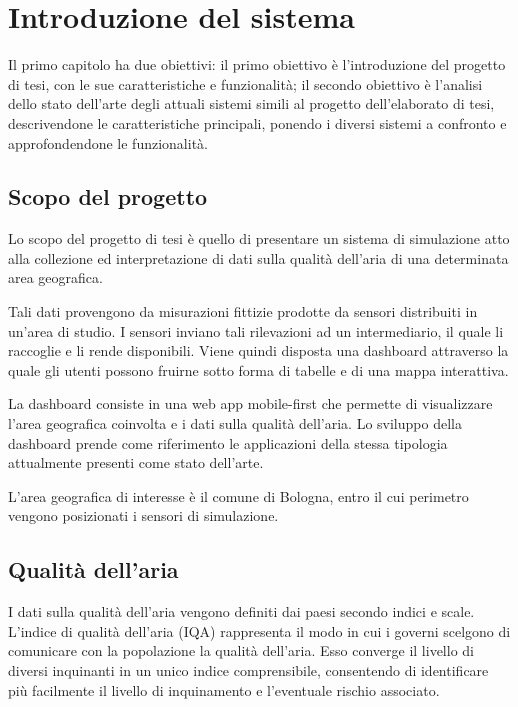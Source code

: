 \clearpage{\pagestyle{empty}\cleardoublepage}
\chapter{Introduzione del sistema}
\lhead[\fancyplain{}{\bfseries\thepage}]{\fancyplain{}{\bfseries\rightmark}}

Il primo capitolo ha due obiettivi:
il primo obiettivo è l'introduzione del progetto di tesi, con le sue caratteristiche e funzionalità;
il secondo obiettivo è l'analisi dello stato dell'arte degli attuali sistemi simili al progetto dell'elaborato di tesi,
descrivendone le caratteristiche principali, ponendo i diversi sistemi a confronto e approfondendone le funzionalità.

\section{Scopo del progetto}

Lo scopo del progetto di tesi è quello di presentare un sistema di simulazione atto alla collezione ed interpretazione
di dati sulla qualità dell'aria di una determinata area geografica.

Tali dati provengono da misurazioni fittizie prodotte da sensori distribuiti in un'area di studio.
I sensori inviano tali rilevazioni ad un intermediario, il quale li raccoglie e li rende disponibili.
Viene quindi disposta una dashboard attraverso la quale gli utenti possono fruirne sotto forma di tabelle e
di una mappa interattiva.

La dashboard consiste in una web app mobile-first che permette di visualizzare l'area geografica coinvolta e
i dati sulla qualità dell'aria.
Lo sviluppo della dashboard prende come riferimento le applicazioni della stessa tipologia attualmente presenti
come stato dell'arte.

L'area geografica di interesse è il comune di Bologna, entro il cui perimetro vengono posizionati i sensori
di simulazione.

\cite{Accuweather}

\section{Qualità dell'aria}
I dati sulla qualità dell'aria vengono definiti dai paesi secondo indici e scale.
L'indice di qualità dell'aria (IQA) rappresenta il modo in cui i governi scelgono di comunicare con la popolazione
la qualità dell'aria. Esso converge il livello di diversi inquinanti in un unico indice comprensibile,
consentendo di identificare più facilmente il livello di inquinamento e l'eventuale rischio associato.

